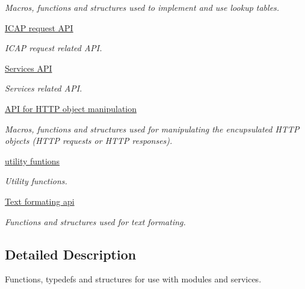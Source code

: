 \begin{DoxyCompactItemize}
\begin{DoxyCompactList}\small\item\em Macros, functions and structures used to implement and use lookup tables. \item\end{DoxyCompactList}\item 
\hyperlink{group__REQUEST}{ICAP request API}


\begin{DoxyCompactList}\small\item\em ICAP request related API. \item\end{DoxyCompactList}\item 
\hyperlink{group__SERVICES}{Services API}


\begin{DoxyCompactList}\small\item\em Services related API. \item\end{DoxyCompactList}\item 
\hyperlink{group__HTTP}{API for HTTP object manipulation}


\begin{DoxyCompactList}\small\item\em Macros, functions and structures used for manipulating the encupsulated HTTP objects (HTTP requests or HTTP responses). \item\end{DoxyCompactList}\item 
\hyperlink{group__UTILITY}{utility funtions}


\begin{DoxyCompactList}\small\item\em Utility functions. \item\end{DoxyCompactList}\item 
\hyperlink{group__FORMATING}{Text formating api}


\begin{DoxyCompactList}\small\item\em Functions and structures used for text formating. \item\end{DoxyCompactList}\end{DoxyCompactItemize}


\subsection{Detailed Description}
Functions, typedefs and structures for use with modules and services. 